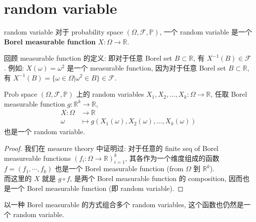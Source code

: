 \chapter{random variable}

\begin{definition}{random variable}
    对于 probability space \((\Omega, \mathcal{F}, \mathbb{P})\), 一个 random variable 是一个 \textbf{Borel measurable function} $X: \Omega \rightarrow \mathbb{R}$.
\end{definition}

\begin{remark}
    回顾 measurable function 的定义: 即对于任意 Borel set $B \subset \mathbb{R}$, 有 $X^{-1}(B) \in \mathcal{F}$.
    例如: \(X(\omega) = \omega^2\) 是一个 measurable function, 因为对于任意 Borel set $B \subset \mathbb{R}$, 有 $X^{-1}(B) = \{\omega \in \Omega | \omega^2 \in B\} \in \mathcal{F}$.
\end{remark}





\begin{proposition}
    Prob space \((\Omega, \mathcal{F}, \mathbb{P})\) 上的 
    random variables \(X_1, X_2, \ldots, X_k: \Omega \rightarrow \mathbb{R}\),
    任取 Borel measurable function \(g: \mathbb{R}^k \rightarrow \mathbb{R}\), 
    \begin{align*}
        X: \Omega &\rightarrow \mathbb{R} \\
        \omega &\mapsto g(X_1(\omega), X_2(\omega), \ldots, X_k(\omega))
    \end{align*}
    也是一个 random variable.
\end{proposition}
\begin{proof}
    我们在 measure theory 中证明过: 对于任意的 finite seq of Borel measureable functions 
    \( (  {f_i}: \Omega \to \mathbb{R} )_{i=1}^k\), 其各作为一个维度组成的函数
    \(f = (f_1,\cdots, f_k)\) 也是一个 Borel measurable function (from \(\Omega\) 到 \(\mathbb{R}^k\)).\\
    而这里的 \(X\) 就是 \(g \circ f\), 是两个 Borel measurable function 的 composition, 因而也是一个 Borel measurable function (即 random variable).
\end{proof}
\begin{remark}
    以一种 Borel measurable 的方式组合多个 random variables, 这个函数也仍然是一个 random variable.
\end{remark}


